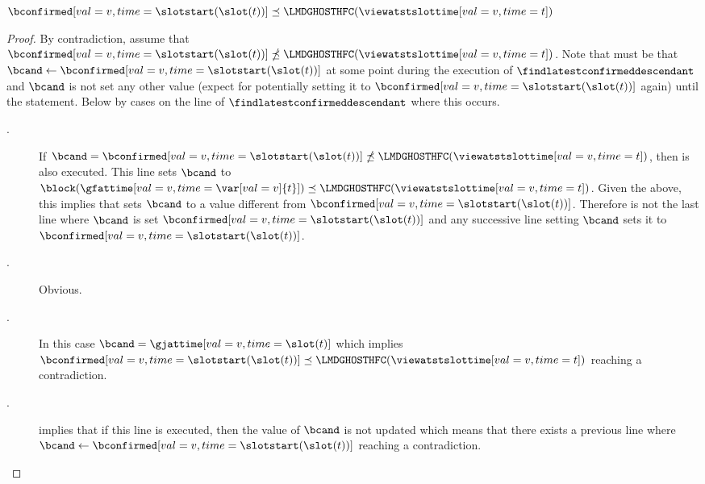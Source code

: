 \documentclass{article}
\begin{document}
\begin{lemma}
    $\bconfirmed[val=v,time=\slotstart(\slot(t))] \preceq \LMDGHOSTHFC(\viewatstslottime[val=v,time=t])$\label{lem:bconf-always-canonical}
\end{lemma}
\begin{proof}
    By contradiction, assume that $\bconfirmed[val=v,time=\slotstart(\slot(t))] \npreceq \LMDGHOSTHFC(\viewatstslottime[val=v,time=t])$.
    Note that must be that $\bcand \gets \bconfirmed[val=v,time=\slotstart(\slot(t))]$ at some point during the execution of  $\findlatestconfirmeddescendant$ and $\bcand$ is not set any other value (expect for potentially setting it to $\bconfirmed[val=v,time=\slotstart(\slot(t))]$ again) until the  statement.
    Below by cases on the line  of $\findlatestconfirmeddescendant$ where this occurs.
    \begin{description}
        \item[.] 
        If $\bcand = \bconfirmed[val=v,time=\slotstart(\slot(t))] \npreceq \LMDGHOSTHFC(\viewatstslottime[val=v,time=t])$, then  is also executed.
        This line sets $\bcand$ to $\block(\gfattime[val=v,time={\var[val=v]{t}}]) \preceq \LMDGHOSTHFC(\viewatstslottime[val=v,time=t])$. 
        Given the above, this implies that  sets $\bcand$ to a value different from $\bconfirmed[val=v,time=\slotstart(\slot(t))]$.
        Therefore  is not the last line where $\bcand$ is set $\bconfirmed[val=v,time=\slotstart(\slot(t))]$ and any successive line setting $\bcand$ sets it to $\bconfirmed[val=v,time=\slotstart(\slot(t))]$.
        \item[.] Obvious.
        \item[.] In this case $\bcand = \gjattime[val=v,time=\slot(t)]$ which implies $\bconfirmed[val=v,time=\slotstart(\slot(t))] \preceq \LMDGHOSTHFC(\viewatstslottime[val=v,time=t])$ reaching a contradiction.
        \item[.]   implies that if this line is executed, then the value of $\bcand$ is not updated which means that there exists a previous line where $\bcand \gets \bconfirmed[val=v,time=\slotstart(\slot(t))]$ reaching a contradiction.
    \end{description}
\end{proof}
\end{document}
